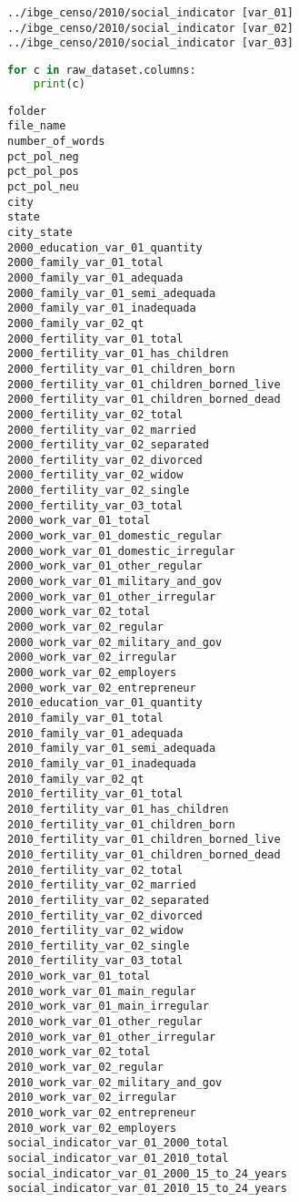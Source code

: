 \begin{lstlisting}
../ibge_censo/2010/social_indicator [var_01] 
../ibge_censo/2010/social_indicator [var_02] 
../ibge_censo/2010/social_indicator [var_03] 
\end{lstlisting}

\begin{lstlisting}[language=Python]
for c in raw_dataset.columns:
    print(c)
\end{lstlisting}

\begin{lstlisting}
folder
file_name
number_of_words
pct_pol_neg
pct_pol_pos
pct_pol_neu
city
state
city_state
2000_education_var_01_quantity
2000_family_var_01_total
2000_family_var_01_adequada
2000_family_var_01_semi_adequada
2000_family_var_01_inadequada
2000_family_var_02_qt
2000_fertility_var_01_total
2000_fertility_var_01_has_children
2000_fertility_var_01_children_born
2000_fertility_var_01_children_borned_live
2000_fertility_var_01_children_borned_dead
2000_fertility_var_02_total
2000_fertility_var_02_married
2000_fertility_var_02_separated
2000_fertility_var_02_divorced
2000_fertility_var_02_widow
2000_fertility_var_02_single
2000_fertility_var_03_total
2000_work_var_01_total
2000_work_var_01_domestic_regular
2000_work_var_01_domestic_irregular
2000_work_var_01_other_regular
2000_work_var_01_military_and_gov
2000_work_var_01_other_irregular
2000_work_var_02_total
2000_work_var_02_regular
2000_work_var_02_military_and_gov
2000_work_var_02_irregular
2000_work_var_02_employers
2000_work_var_02_entrepreneur
2010_education_var_01_quantity
2010_family_var_01_total
2010_family_var_01_adequada
2010_family_var_01_semi_adequada
2010_family_var_01_inadequada
2010_family_var_02_qt
2010_fertility_var_01_total
2010_fertility_var_01_has_children
2010_fertility_var_01_children_born
2010_fertility_var_01_children_borned_live
2010_fertility_var_01_children_borned_dead
2010_fertility_var_02_total
2010_fertility_var_02_married
2010_fertility_var_02_separated
2010_fertility_var_02_divorced
2010_fertility_var_02_widow
2010_fertility_var_02_single
2010_fertility_var_03_total
2010_work_var_01_total
2010_work_var_01_main_regular
2010_work_var_01_main_irregular
2010_work_var_01_other_regular
2010_work_var_01_other_irregular
2010_work_var_02_total
2010_work_var_02_regular
2010_work_var_02_military_and_gov
2010_work_var_02_irregular
2010_work_var_02_entrepreneur
2010_work_var_02_employers
social_indicator_var_01_2000_total
social_indicator_var_01_2010_total
social_indicator_var_01_2000_15_to_24_years
social_indicator_var_01_2010_15_to_24_years

\end{lstlisting}
